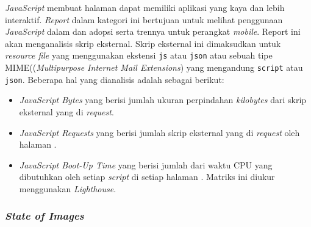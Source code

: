 \textit{JavaScript} membuat halaman \web dapat memiliki aplikasi yang kaya dan lebih interaktif. \textit{Report} dalam kategori ini bertujuan untuk melihat penggunaan \textit{JavaScript} dalam \web dan adopsi serta trennya untuk perangkat \textit{mobile}. Report ini akan menganalisis skrip eksternal. Skrip eksternal ini dimaksudkan untuk \textit{resource file} yang menggunakan ekstensi \verb|js| atau \verb|json| atau sebuah tipe MIME((\textit{Multipurpose Internet Mail Extensions}) yang mengandung \verb|script| atau \verb|json|. Beberapa hal yang dianalisis adalah sebagai berikut:
\begin{itemize}
    \item \textit{JavaScript Bytes} yang berisi jumlah ukuran perpindahan \textit{kilobytes} dari skrip eksternal yang di \textit{request}. 

    \item \textit{JavaScript Requests} yang berisi jumlah skrip eksternal yang di \textit{request} oleh halaman \web.

    
    \item \textit{JavaScript Boot-Up Time} yang berisi jumlah dari waktu CPU yang dibutuhkan oleh setiap \textit{script} di setiap halaman \web. Matriks ini diukur menggunakan \textit{Lighthouse}.
\end{itemize}

\subsubsection{\textit{State of Images}}

